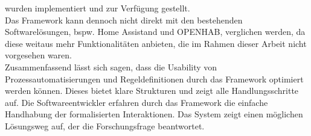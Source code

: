     wurden implementiert und zur Verfügung gestellt.
    \\
    \linebreak
    Das Framework kann dennoch nicht direkt mit den bestehenden Softwarelösungen, bspw. Home Assistand und \acs{OPENHAB}, verglichen 
    werden, da diese weitaus mehr Funktionalitäten anbieten, die im Rahmen dieser Arbeit nicht vorgesehen waren. 
    \\
    \linebreak
    Zusammenfassend lässt sich sagen, dass die Usability von Prozessautomatisierungen und Regeldefinitionen durch das Framework 
    optimiert werden können. Dieses bietet klare Strukturen und zeigt alle Handlungsschritte auf. Die Softwareentwickler erfahren 
    durch das Framework die einfache Handhabung der formalisierten Interaktionen. Das System zeigt einen möglichen Lösungsweg auf, 
    der die Forschungsfrage beantwortet. 